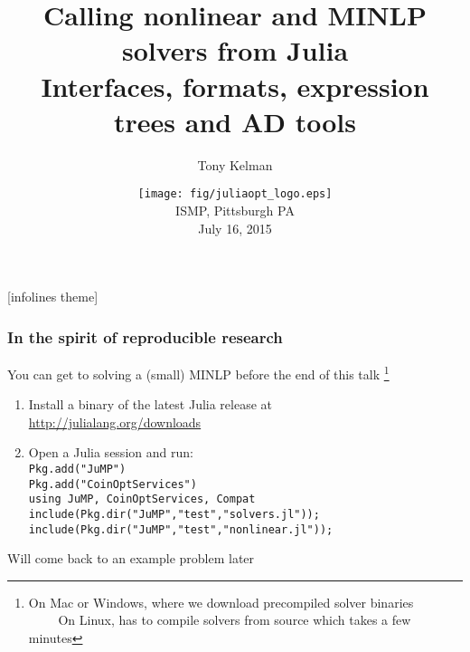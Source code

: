 \documentclass[compressed,dvips,letter]{beamer}
\title[Calling MINLP solvers from Julia]
{Calling nonlinear and MINLP solvers from Julia\\
\vspace{5pt}
\small Interfaces, formats, expression trees and AD tools
\vspace{-10pt}}
\author{Tony Kelman}
\institute[UC Berkeley]
{
  University of California, Berkeley \\
  
  \vspace{5pt}
  {\fontfamily{pcr}\selectfont kelman@berkeley.edu} \\

  \vspace{5pt}
  \url{https://github.com/tkelman}
}
\date[ISMP, July 16 2015]{\texttt{[image: fig/juliaopt\_logo.eps]}
\\ISMP, Pittsburgh PA\\July 16, 2015}
\makeatletter
\newcommand{\verbatimfont}[1]{\def\verbatim@font{#1}}%
\makeatother
\begin{document}
\verbatimfont{\fontfamily{pcr}\selectfont}

\begin{frame}
  \titlepage
\end{frame}


%
%
\setcounter{framenumber}{0}
[infolines theme]



\begin{frame}[fragile]\frametitle{In the spirit of reproducible research}

You can get to solving a (small) MINLP before the end of this talk
\footnote{On Mac or Windows, where we download precompiled solver binaries \\
~~~~ On Linux, has to compile solvers from source which takes a few minutes}

  \begin{enumerate}
    \item Install a binary of the latest Julia release at \\
      \url{http://julialang.org/downloads}
    \item Open a Julia session and run: \\
      \texttt{Pkg.add("JuMP") \\
      Pkg.add("CoinOptServices") \\
      using JuMP, CoinOptServices, Compat \\
      include(Pkg.dir("JuMP","test","solvers.jl")); \\
      include(Pkg.dir("JuMP","test","nonlinear.jl"));}
  \end{enumerate}

Will come back to an example problem later

\end{frame}
%
%
\end{document}
